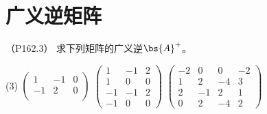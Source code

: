 \documentclass[12pt, a4paper, oneside, UTF8]{ctexbook}
\begin{document}
\else
\fi

\chapter{广义逆矩阵}
\begin{question}（P162.3）
求下列矩阵的广义逆$\bs{A}^{+}$。
\begin{tasks}[label=(\arabic*)](3)
    \task $\begin{pmatrix}
        1 & -1 & 0\\
        -1&2&0\\
    \end{pmatrix}$
    \task $\begin{pmatrix}
        1 & -1&2\\
        1&0&0\\
        -1 & -1 &2\\
        -1&0&0
    \end{pmatrix}$
    \task $\begin{pmatrix}
        -2& 0&0&-2\\
        1&2&-4&3\\
        2 & -1 &2&1\\
        0&2&-4&2
    \end{pmatrix}$
\end{tasks}
\end{question}
\end{document}
